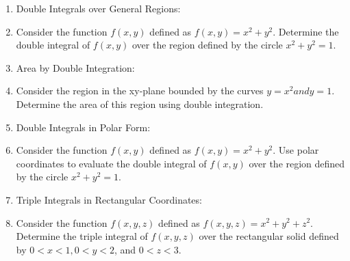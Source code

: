 \documentclass[letterpaper,11pt]{article}
\begin{document}
\begin{enumerate}
    \item Double Integrals over General Regions:
    \item[] Consider the function $f(x,y)$ defined as $f(x,y) = x^2 + y^2$. Determine the double integral of $f(x,y)$ over the region defined by the circle $x^2 + y^2 = 1$.

    \item Area by Double Integration:
    \item[] Consider the region in the xy-plane bounded by the curves $y = x^2 and y = 1$. Determine the area of this region using double integration.

    \item Double Integrals in Polar Form:
    \item[] Consider the function $f(x,y)$ defined as $f(x,y) = x^2 + y^2$. Use polar coordinates to evaluate the double integral of $f(x,y)$ over the region defined by the circle $x^2 + y^2 = 1$.

    \item Triple Integrals in Rectangular Coordinates:
    \item[] Consider the function $f(x,y,z)$ defined as $f(x,y,z) = x^2 + y^2 + z^2$. Determine the triple integral of $f(x,y,z)$ over the rectangular solid defined by $0 < x < 1, 0 < y < 2$, and $0 < z < 3$.

\end{enumerate}
\end{document}

